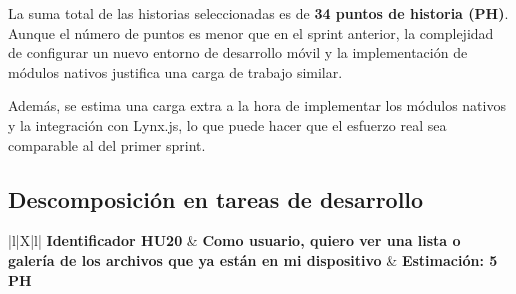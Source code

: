 La suma total de las historias seleccionadas es de \textbf{34 puntos de historia (PH)}. Aunque el número de puntos es menor que en el sprint anterior, la complejidad de configurar un nuevo entorno de desarrollo móvil y la implementación de módulos nativos justifica una carga de trabajo similar.

Además, se estima una carga extra a la hora de implementar los módulos nativos y la integración con Lynx.js, lo que puede hacer que el esfuerzo real sea comparable al del primer sprint.

\subsection{Descomposición en tareas de desarrollo}

\begin{table}[H]
    \begin{center}
        \begin{tabularx}{\textwidth}{|l|X|l|}
            \hline
            \textbf{Identificador HU20} &
            \textbf{Como usuario, quiero ver una lista o galería de los archivos que ya están en mi dispositivo} &
            \textbf{Estimación: 5 PH}\\
            \hline
\end{tabularx}
\end{center}
\end{table}
